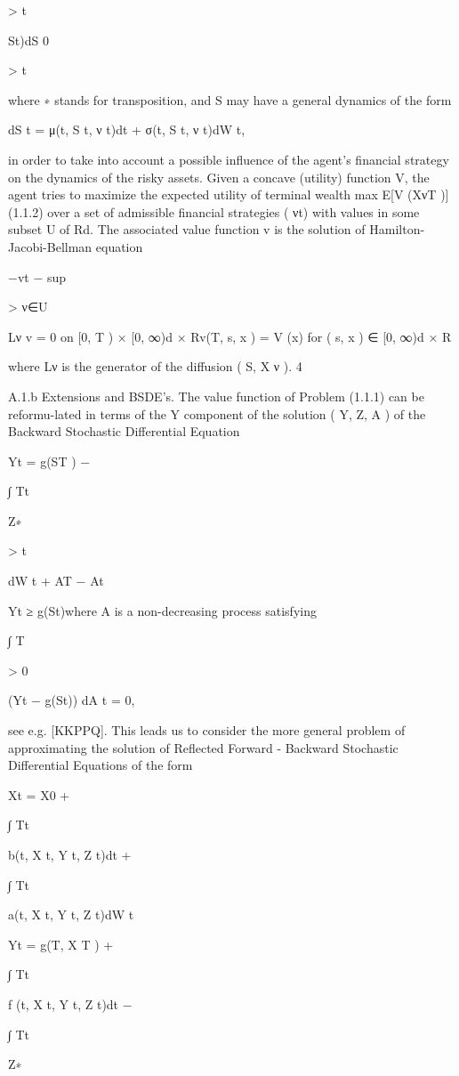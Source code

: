 \documentclass[11pt]{article}
\begin{document}
> t

St)dS 0

> t

where ∗ stands for transposition, and S may have a general dynamics of the form

dS t = μ(t, S t, ν t)dt + σ(t, S t, ν t)dW t,

in order to take into account a possible influence of the agent's financial strategy on the dynamics of the risky assets. Given a concave (utility) function V, the agent tries to maximize the expected utility of terminal wealth max E[V (XνT )] (1.1.2) over a set of admissible financial strategies ( νt) with values in some subset U of Rd. The associated value function v is the solution of Hamilton-Jacobi-Bellman equation

−vt − sup

> ν∈U

Lν v = 0 on [0, T ) × [0, ∞)d × Rv(T, s, x ) = V (x) for ( s, x ) ∈ [0, ∞)d × R

where Lν is the generator of the diffusion ( S, X ν ). 4

A.1.b Extensions and BSDE's. The value function of Problem (1.1.1) can be reformu-lated in terms of the Y component of the solution ( Y, Z, A ) of the Backward Stochastic Differential Equation

Yt = g(ST ) −

∫ Tt

Z∗

> t

dW t + AT − At

Yt ≥ g(St)where A is a non-decreasing process satisfying

∫ T

> 0

(Yt − g(St)) dA t = 0,

see e.g. [KKPPQ]. This leads us to consider the more general problem of approximating the solution of Reflected Forward - Backward Stochastic Differential Equations of the form

Xt = X0 +

∫ Tt

b(t, X t, Y t, Z t)dt +

∫ Tt

a(t, X t, Y t, Z t)dW t

Yt = g(T, X T ) +

∫ Tt

f (t, X t, Y t, Z t)dt −

∫ Tt

Z∗
\end{document}
